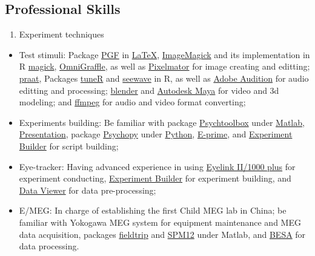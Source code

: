 \documentclass[
  12pt,
]{article}
\providecommand{\tightlist}{%
  \setlength{\itemsep}{0pt}\setlength{\parskip}{0pt}}
\begin{document}
\hypertarget{professional-skills}{%
\subsection{Professional Skills}\label{professional-skills}}

\begin{enumerate}
\def\labelenumi{\arabic{enumi}.}
\tightlist
\item
  Experiment techniques
\end{enumerate}

\begin{itemize}
\item
  Test stimuli: Package \href{https://ctan.org/pkg/pgf?lang=en}{PGF} in
  \href{https://www.latex-project.org}{LaTeX},
  \href{https://imagemagick.org}{ImageMagick} and its implementation in
  R
  \href{https://cran.r-project.org/web/packages/magick/index.html}{magick},
  \href{https://www.omnigroup.com/omnigraffle/}{OmniGraffle}, as well as
  \href{https://www.pixelmator.com}{Pixelmator} for image creating and
  editting; \href{http://www.fon.hum.uva.nl/praat/}{praat}, Packages
  \href{https://cran.r-project.org/web/packages/tuneR/index.html}{tuneR}
  and \href{https://cran.r-project.org/package=seewave}{seewave} in R,
  as well as \href{https://www.adobe.com/products/audition.html}{Adobe
  Audition} for audio editting and processing;
  \href{https://www.blender.org}{blender} and
  \href{https://www.autodesk.com/products/maya/overview}{Autodesk Maya}
  for video and 3d modeling; and \href{https://ffmpeg.org}{ffmpeg} for
  audio and video format converting;
\item
  Experiments building: Be familiar with package
  \href{http://psychtoolbox.org}{Psychtoolbox} under
  \href{https://www.mathworks.com/products/matlab.html}{Matlab},
  \href{https://www.neurobs.com/presentation}{Presentation}, package
  \href{http://www.psychopy.org}{Psychopy} under
  \href{https://www.python.org}{Python},
  \href{https://www.pstnet.com/eprime.cfm}{E-prime}, and
  \href{https://www.sr-research.com/experiment-builder/}{Experiment
  Builder} for script building;
\item
  Eye-tracker: Having advanced experience in using
  \href{https://www.sr-research.com}{Eyelink II/1000 plus} for
  experiment conducting,
  \href{https://www.sr-research.com/experiment-builder/}{Experiment
  Builder} for experiment building, and
  \href{https://www.sr-research.com/data-viewer/}{Data Viewer} for data
  pre-processing;
\item
  E/MEG: In charge of establishing the first Child MEG lab in China; be
  familiar with Yokogawa MEG system for equipment maintenance and MEG
  data acquisition, packages
  \href{http://www.fieldtriptoolbox.org}{fieldtrip} and
  \href{https://github.com/neurodebian/spm12}{SPM12} under Matlab, and
  \href{http://www.besa.de}{BESA} for data processing.
\end{itemize}
\end{document}
